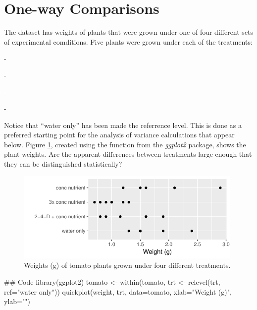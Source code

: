 \section{One-way Comparisons}

The dataset  has weights of plants that were grown
under one of four different sets of experimental comditions.
Five plants were grown under each of the treatments:
\begin{itemizz}
  \item[-] 
  \item[-] 
  \item[-] 
  \item[-] 
\end{itemizz}
Notice that ``water only'' has been made the referrence level.  This
is done as a preferred starting point for the analysis of variance
calculations that appear below.  Figure \ref{fig:Tomato}, created
using the function  from the {\em ggplot2} package,
shows the plant weights.  Are the apparent differences between
treatments large enough that they can be distinguished statistically?

\begin{figure}
\vspace*{-6pt}
\begin{Schunk}


\centerline{\includegraphics[width=0.98\textwidth]{figs/05-gg-tomato-1} }

\end{Schunk}
\caption{Weights (g) of tomato plants grown under four different
  treatments.\label{fig:Tomato}}
\end{figure}
\begin{fullwidth}

\begin{Schunk}
\begin{Sinput}
## Code
library(ggplot2)
tomato <- within(tomato, trt <- relevel(trt, ref="water only"))
quickplot(weight, trt, data=tomato, xlab="Weight (g)", ylab="")
\end{Sinput}
\end{Schunk}

\end{fullwidth}

